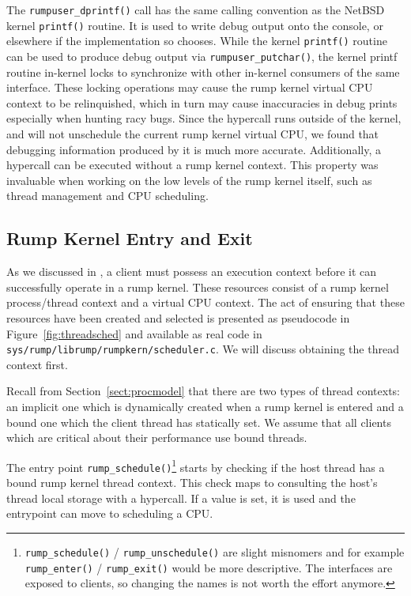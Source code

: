 The \verb+rumpuser_dprintf()+ call has the same calling convention as
the NetBSD kernel \verb+printf()+ routine.  It is used to write debug output
onto the console, or elsewhere if the implementation so chooses.
While the kernel \verb+printf()+ routine can be used to
produce debug output via \verb+rumpuser_putchar()+, the kernel
printf routine in-kernel locks to
synchronize with other in-kernel consumers of the same interface.  These
locking operations may cause the rump kernel virtual CPU context
to be relinquished, which in turn may cause inaccuracies in debug
prints especially when hunting racy bugs.  Since the hypercall runs
outside of the kernel, and will not unschedule the current rump
kernel virtual CPU, we found that debugging information produced
by it is much more accurate.  Additionally, a hypercall can be
executed without a rump kernel context.  This property was invaluable
when working on the low levels of the rump kernel itself, such as
thread management and CPU scheduling.

\subsection{Rump Kernel Entry and Exit}
\label{sect:rumpentry}

As we discussed in , a client must possess
an execution context before it can successfully operate in a rump
kernel.  These resources consist of a rump kernel process/thread
context and a virtual CPU context.  The act of ensuring that
these resources have been created and selected is presented as
pseudocode in Figure~\ref{fig:threadsched} and available as real
code in \texttt{sys/rump/librump/rumpkern/scheduler.c}.  We will
discuss obtaining the thread context first.

Recall from Section~\ref{sect:procmodel} that there are two types of
thread contexts: an implicit one which is dynamically created when
a rump kernel is entered and a bound one which the client thread has
statically set.  We assume that all clients which are critical about
their performance use bound threads.

The entry point \verb+rump_schedule()+\footnote
{
	\texttt{rump\_schedule()} / \texttt{rump\_unschedule()} are slight
	misnomers and for example \texttt{rump\_enter()} / \texttt{rump\_exit()}
	would be more descriptive.  The interfaces are exposed to
	clients, so changing the names is not worth the effort anymore.
}
starts by checking if the host thread has a bound rump kernel
thread context.  This check maps to consulting the host's thread
local storage with a hypercall.  If a value is set, it is used and
the entrypoint can move to scheduling a CPU.

